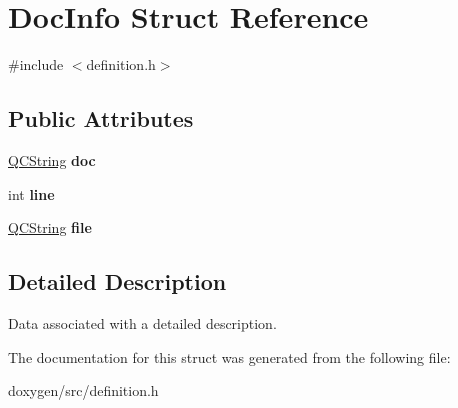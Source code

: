 \hypertarget{struct_doc_info}{}\section{Doc\+Info Struct Reference}
\label{struct_doc_info}


{\ttfamily \#include $<$definition.\+h$>$}

\subsection*{Public Attributes}
\begin{DoxyCompactItemize}
\item 
\mbox{\label{struct_doc_info_a543c5554fb4ecb5b71acd47f6ea39374}} 
\mbox{\hyperlink{class_q_c_string}{Q\+C\+String}} {\bfseries doc}
\item 
\mbox{\label{struct_doc_info_aa2776b16e60d965359c3c950cd08cf7d}} 
int {\bfseries line}
\item 
\mbox{\label{struct_doc_info_ab1a7c311382d55b036dc8731428e0765}} 
\mbox{\hyperlink{class_q_c_string}{Q\+C\+String}} {\bfseries file}
\end{DoxyCompactItemize}


\subsection{Detailed Description}
Data associated with a detailed description. 

The documentation for this struct was generated from the following file\+:\begin{DoxyCompactItemize}
\item 
doxygen/src/definition.\+h\end{DoxyCompactItemize}
